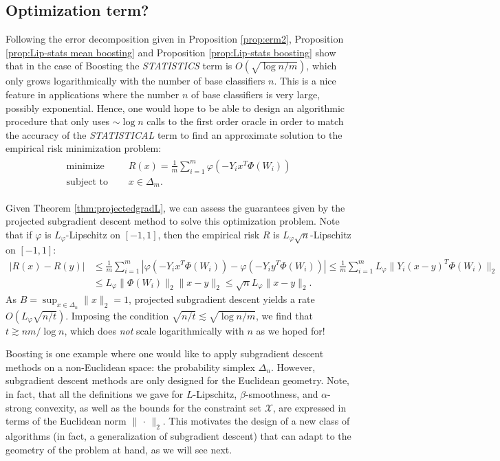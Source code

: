 \subsection{Optimization term?}
Following the error decomposition given in Proposition \ref{prop:erm2}, Proposition \ref{prop:Lip-stats mean boosting} and Proposition \ref{prop:Lip-stats boosting} show that in the case of Boosting the \emph{STATISTICS} term is $O(\sqrt{\log n/m})$, which only grows logarithmically with the number of base classifiers $n$. This is a nice feature in applications where the number $n$ of base classifiers is very large, possibly exponential.
Hence, one would hope to be able to design an algorithmic procedure that only uses $\sim\log n$ calls to the first order oracle in order to match the accuracy of the \emph{STATISTICAL} term to find an approximate solution to the empirical risk minimization problem:
\begin{align*}
	\begin{aligned}
		\text{minimize }\quad   & R(x) = \frac{1}{m} \sum_{i=1}^m \varphi(-Y_ix^T\Phi(W_i))\\
		\text{subject to }\quad & x\in \Delta_m.
	\end{aligned}
\end{align*}

Given Theorem \ref{thm:projectedgradL}, we can assess the guarantees given by the projected subgradient descent method to solve this optimization problem. Note that if $\varphi$ is $L_\varphi$-Lipschitz on $[-1,1]$, then the empirical risk $R$ is $L_\varphi\sqrt{n}$-Lipschitz on $[-1,1]$:
\begin{align*}
	|R(x)-R(y)| 
	&\le \frac{1}{m} \sum_{i=1}^m | \varphi(-Y_ix^T\Phi(W_i)) - \varphi(-Y_iy^T\Phi(W_i)) |
	\le 
	\frac{1}{m} \sum_{i=1}^m L_\varphi \| Y_i(x-y)^T\Phi(W_i) \|_2\\
	&\le L_\varphi \| \Phi(W_i) \|_2 \| x-y \|_2
	\le \sqrt{n}L_\varphi \| x-y \|_2.
\end{align*}
As $B=\sup_{x\in\Delta_n}\|x\|_2=1$, projected subgradient descent yields a rate $O(L_\varphi\sqrt{n/t})$. Imposing the condition $\sqrt{n/t} \lesssim \sqrt{\log n/m}$, we find that $t\gtrsim nm/\log n$, which does \emph{not} scale logarithmically with $n$ as we hoped for!

Boosting is one example where one would like to apply subgradient descent methods on a non-Euclidean space: the probability simplex $\Delta_n$. However, subgradient descent methods are only designed for the Euclidean geometry. Note, in fact, that all the definitions we gave for $L$-Lipschitz, $\beta$-smoothness, and $\alpha$-strong convexity, as well as the bounds for the constraint set $\mathcal{X}$, are expressed in terms of the Euclidean norm $\|\,\cdot\,\|_2$. This motivates the design of a new class of algorithms (in fact, a generalization of subgradient descent) that can adapt to the geometry of the problem at hand, as we will see next.
